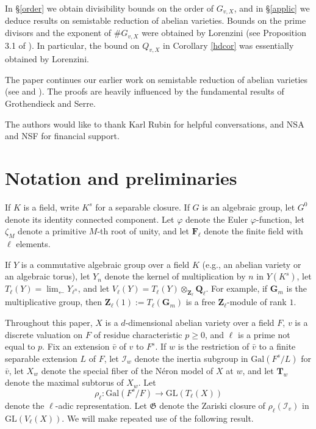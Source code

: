 \documentclass{amsart}
\def\Q{{\mathbf Q}}
\def\Z{{\mathbf Z}}
\def\F{{\mathbf F}}
\def\Gal{\mathrm{Gal}}
\def\I{{\mathcal I}}
\def\r{{\mathfrak G}}
\def\GL{\mathrm{GL}}
\def\T{{\mathbf T}}
\def\invlim{{\displaystyle{\lim_{\leftarrow}}}}
\theoremstyle{definition}
\begin{document}
In \S\ref{order} we obtain divisibility bounds on the order of $G_{v,X}$, 
and in \S\ref{applic} we deduce results on 
semistable reduction of abelian varieties.
Bounds on the prime divisors and the exponent
of $\#G_{v,X}$ were obtained
by Lorenzini (see Proposition 3.1 of \cite{Lorenzini}).
In particular, the bound on $Q_{v,X}$ in Corollary \ref{hdcor}
was essentially obtained by Lorenzini.

The paper continues our earlier work on semistable reduction
of abelian varieties (see \cite{semistab}
and \cite{smalldeg}). The proofs are heavily influenced by 
the fundamental results of Grothendieck and Serre.

The authors would like to thank Karl Rubin for helpful
conversations, and NSA and NSF for financial support.

\section{Notation and preliminaries}
\label{prelim}

If $K$ is a field, write $K^s$ for a separable closure.
If $G$ is an algebraic group, let $G^{0}$
denote its identity connected component. 
Let $\varphi$ denote the Euler $\varphi$-function, let
$\zeta_{M}$ denote a primitive $M$-th root of unity,
and let $\F_{\ell}$ denote the finite field with $\ell$ elements.

If $Y$ is a commutative algebraic group over a field $K$
(e.g., an abelian variety or an algebraic torus), let 
$Y_{n}$ denote the kernel of multiplication by $n$ in $Y(K^{s})$, 
let 
$T_{\ell}(Y) = \invlim Y_{\ell^{n}}$, and let $V_{\ell}(Y) = 
T_{\ell}(Y) \otimes_{\Z_{\ell}} \Q_{\ell}$. 
For example, if ${\mathbf G}_{m}$ is the multiplicative group,
then $\Z_\ell(1):=T_{\ell}({\mathbf G}_{m})$ is a free 
$\Z_{\ell}$-module of rank $1$. 

Throughout this paper, 
$X$ is a $d$-dimensional abelian variety over a field $F$, 
$v$ is a discrete valuation on $F$ of residue characteristic $p \ge 0$,
and $\ell$ is a prime not equal to $p$.
Fix an extension ${\bar v}$ of $v$ to 
$F^s$. 
If $w$ is the restriction of ${\bar v}$ to a finite separable 
extension $L$ of $F$, let $\I_{w}$ denote the inertia subgroup in 
$\Gal(F^{s}/L)$ for ${\bar v}$,
let $X_{w}$ denote the special fiber of the N\'eron model
of $X$ at $w$, and
let $\T_{w}$ denote the maximal subtorus of $X_{w}$.
Let
$$\rho_{\ell}:\Gal(F^s/F)\to\GL(T_\ell(X))$$
denote the $\ell$-adic representation.
Let 
$\r$ denote the Zariski closure of $\rho_{\ell}(\I_{v})$ in
$\GL(V_{\ell}(X))$. 
We will make repeated use of the following result.
\end{document}
